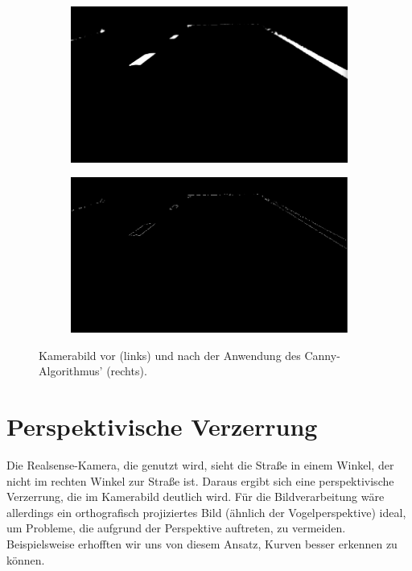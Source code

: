 \documentclass[a4paper,12pt]{report}
\begin{document}
	\begin{figure}
		\centering
		\begin{subfigure}[c]{0.45\textwidth}
			\includegraphics[width=\textwidth]{assets/Strasse-Binaer.png}
		\end{subfigure}
		\begin{subfigure}[c]{0.45\textwidth}
			\includegraphics[width=\textwidth]{assets/Strasse-Canny.png}
		\end{subfigure}
		\caption{Kamerabild vor (links) und nach der Anwendung des Canny-Algorithmus' (rechts).}
		\label{img-applying-canny}
	\end{figure}

\section{Perspektivische Verzerrung}
	Die Realsense-Kamera, die genutzt wird, sieht die Straße in einem Winkel, der nicht im rechten Winkel zur Straße ist.
	Daraus ergibt sich eine perspektivische Verzerrung, die im Kamerabild deutlich wird.
	Für die Bildverarbeitung wäre allerdings ein orthografisch projiziertes Bild (ähnlich der Vogelperspektive) ideal, um Probleme, die aufgrund der Perspektive auftreten, zu vermeiden.
	Beispielsweise erhofften wir uns von diesem Ansatz, Kurven besser erkennen zu können.
\end{document}
